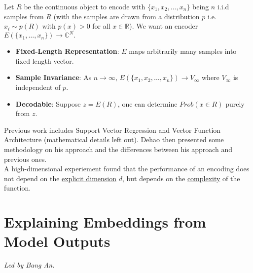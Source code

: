 \documentclass[12pt]{amsart}
\begin{document}
Let $R$ be the continuous object to encode with $\{x_1, x_2, \dots, x_n\}$ being $n$ i.i.d samples from $R$ (with the samples are drawn from a distribution $p$ i.e. $x_i \sim p(R)$ with $p(x) > 0$ for all $x \in \mathbb{R}$). We want an encoder $E(\{x_1, \dots, x_n\}) \rightarrow \mathbb{C}^N.$

\begin{itemize}
    \item \textbf{Fixed-Length Representation}: $E$ maps arbitrarily many samples into fixed length vector.
    \item \textbf{Sample Invariance}: As $n \rightarrow \infty$, $E(\{x_1, x_2, \dots, x_n\}) \rightarrow V_\infty$ where $V_\infty$ is independent of $p$.
    \item \textbf{Decodable}: Suppose $z=E(R)$, one can determine $Prob(x \in R)$ purely from $z$.
\end{itemize}

Previous work includes Support Vector Regression and Vector Function Architecture (mathematical details left out). Dehao then presented some methodology on his approach and the differences between his approach and previous ones. \\

A high-dimensional experiement found that the performance of an encoding does not depend on the \underline{explicit dimension} $d$, but depends on the \underline{complexity} of the function.

\section{Explaining Embeddings from Model Outputs}

\textit{Led by Bang An.} \\
\end{document}

